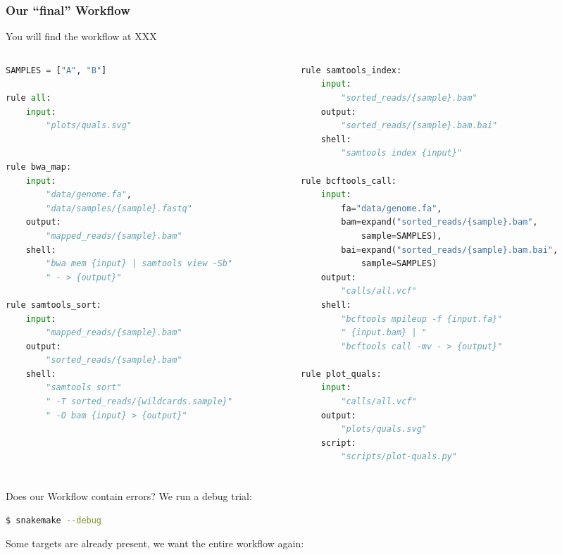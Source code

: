 \begin{frame}[fragile]
  \frametitle{Our ``final'' Workflow}
  You will find the workflow at XXX
  \begin{columns}
    \begin{column}{0.5\textwidth}
      \begin{lstlisting}[language=Python,style=Python,basicstyle=\tiny]
SAMPLES = ["A", "B"]

rule all:
    input:
        "plots/quals.svg"


rule bwa_map:
    input:
        "data/genome.fa",
        "data/samples/{sample}.fastq"
    output:
        "mapped_reads/{sample}.bam"
    shell:
        "bwa mem {input} | samtools view -Sb"
        " - > {output}"

rule samtools_sort:
    input:
        "mapped_reads/{sample}.bam"
    output:
        "sorted_reads/{sample}.bam"
    shell:
        "samtools sort"
        " -T sorted_reads/{wildcards.sample}"
        " -O bam {input} > {output}"
      \end{lstlisting}
    \end{column}
    \begin{column}{0.5\textwidth}
      \begin{lstlisting}[language=Python,style=Python,basicstyle=\tiny]
rule samtools_index:
    input:
        "sorted_reads/{sample}.bam"
    output:
        "sorted_reads/{sample}.bam.bai"
    shell:
        "samtools index {input}"

rule bcftools_call:
    input:
        fa="data/genome.fa",
        bam=expand("sorted_reads/{sample}.bam",
            sample=SAMPLES),
        bai=expand("sorted_reads/{sample}.bam.bai",
            sample=SAMPLES)
    output:
        "calls/all.vcf"
    shell:
        "bcftools mpileup -f {input.fa}"
        " {input.bam} | "
        "bcftools call -mv - > {output}"

rule plot_quals:
    input:
        "calls/all.vcf"
    output:
        "plots/quals.svg"
    script:
        "scripts/plot-quals.py"
      \end{lstlisting}
    \end{column}
  \end{columns}
\end{frame}

\begin{frame}[fragile]
  \frametitle{}
  Does our Workflow contain errors? We run a debug trial:
  \begin{lstlisting}[language=Bash, style=Shell]
$ snakemake --debug
  \end{lstlisting}
  \pause
  Some targets are already present, we want the entire workflow again:
  \begin{lstlisting}[language=Bash, style=Shell]
% $ snakemake -j4 --forcerun
  \end{lstlisting}
\end{frame}

